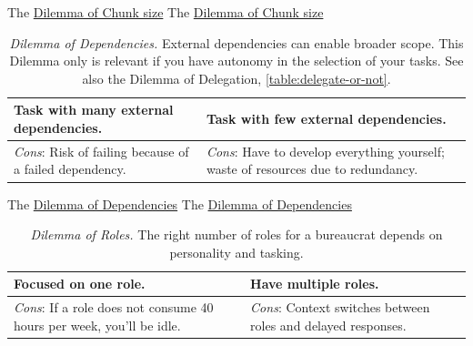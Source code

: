 The \href{table:chunk-size}{Dilemma of Chunk size}
The \href{table:chunk-size}{Dilemma of Chunk size}


\begin{center}
\begin{table}[H] %
\begin{tabular}{ | m{\dilemmatablewidth}| m{\dilemmatablewidth} | } 
  \hline
  \textbf{Task with many external dependencies.} & 
  \textbf{Task with few external dependencies.} \\ 
  \hline
  \textit{Cons}: Risk of failing because of a failed dependency. & 
  \textit{Cons}: Have to develop everything yourself; waste of resources due to redundancy. \\  
  \hline
\end{tabular}
\caption{
\textit{Dilemma of Dependencies.}
External dependencies can enable broader scope. This Dilemma only is relevant if you have autonomy in the selection of your tasks. See also the Dilemma of Delegation, \ref{table:delegate-or-not}.
}
\label{table:number-of-external-dependencies}
\end{table}
\end{center}


The \href{table:number-of-external-dependencies}{Dilemma of Dependencies}
The \href{table:number-of-external-dependencies}{Dilemma of Dependencies}


\begin{center}
\begin{table}[H] %
\begin{tabular}{ | m{\dilemmatablewidth}| m{\dilemmatablewidth} | } 
  \hline
  \textbf{Focused on one role.} & 
  \textbf{Have multiple roles.} \\ 
  \hline
  \textit{Cons}: If a role does not consume 40 hours per week, you'll be idle. & 
  \textit{Cons}: Context switches between roles and delayed responses. \\  
  \hline
\end{tabular}
\caption{
\textit{Dilemma of Roles.}
The right number of roles for a bureaucrat depends on personality and tasking. 
}
\label{table:number-of-roles}
\end{table}
\end{center}


